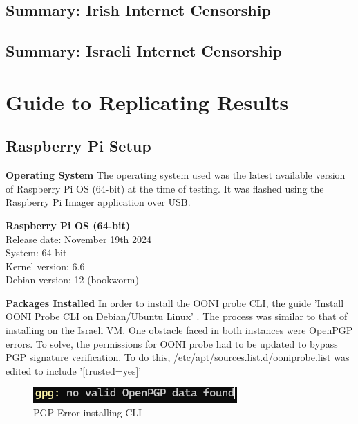 \subsection{Summary: Irish Internet Censorship}
\subsection{Summary: Israeli Internet Censorship}
\subsection{}

\section{Guide to Replicating Results}

\subsection{Raspberry Pi Setup}
\textbf{Operating System}
The operating system used was the latest available version of Raspberry Pi OS (64-bit) at the time of testing. It was flashed using the Raspberry Pi Imager application over USB. 

\begin{flushleft}
\hspace{1em}\textbf{Raspberry Pi OS (64-bit)}\\[0.5em]
\hspace{1em}Release date: November 19th 2024\\[0.5em]
\hspace{1em}System: 64-bit\\[0.5em]
\hspace{1em}Kernel version: 6.6\\[0.5em]
\hspace{1em}Debian version: 12 (bookworm)
\end{flushleft}


\textbf{Packages Installed}
In order to install the OONI probe CLI, the guide 'Install OONI Probe CLI on Debian/Ubuntu Linux' \cite{ooni-cli-install}. The process was similar to that of installing on the Israeli VM. One obstacle faced in both instances were OpenPGP errors. To solve, the permissions for OONI probe had to be updated to bypass PGP signature verification. To do this, /etc/apt/sources.list.d/ooniprobe.list was edited to include '[trusted=yes]'
\begin{figure}
    \centering
    \includegraphics[width=0.5\linewidth]{PGPERROR.png}
    \caption{PGP Error installing CLI}
    \label{fig:enter-label}
\end{figure}


